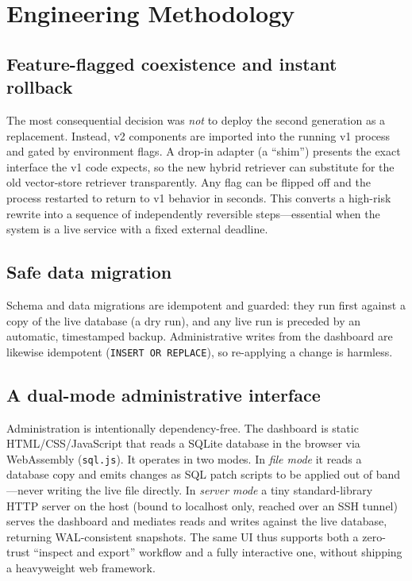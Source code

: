 \documentclass[11pt,letterpaper]{article}
\newcommand{\code}[1]{\texttt{\small #1}}
\begin{document}
\section{Engineering Methodology}
\label{sec:method}

\subsection{Feature-flagged coexistence and instant rollback}
The most consequential decision was \emph{not} to deploy the second generation as a
replacement. Instead, v2 components are imported into the running v1 process and gated
by environment flags. A drop-in adapter (a ``shim'') presents the exact interface the
v1 code expects, so the new hybrid retriever can substitute for the old vector-store
retriever transparently. Any flag can be flipped off and the process restarted to
return to v1 behavior in seconds. This converts a high-risk rewrite into a sequence of
independently reversible steps---essential when the system is a live service with a
fixed external deadline.

\subsection{Safe data migration}
Schema and data migrations are idempotent and guarded: they run first against a copy of
the live database (a dry run), and any live run is preceded by an automatic, timestamped
backup. Administrative writes from the dashboard are likewise idempotent
(\code{INSERT OR REPLACE}), so re-applying a change is harmless.

\subsection{A dual-mode administrative interface}
Administration is intentionally dependency-free. The dashboard is static
HTML/CSS/JavaScript that reads a SQLite database in the browser via WebAssembly
(\code{sql.js}). It operates in two modes. In \emph{file mode} it reads a database copy
and emits changes as SQL patch scripts to be applied out of band---never writing the
live file directly. In \emph{server mode} a tiny standard-library HTTP server on the
host (bound to localhost only, reached over an SSH tunnel) serves the dashboard and
mediates reads and writes against the live database, returning WAL-consistent
snapshots. The same UI thus supports both a zero-trust ``inspect and export'' workflow
and a fully interactive one, without shipping a heavyweight web framework.
\end{document}
